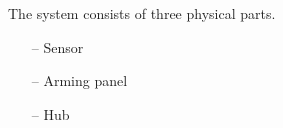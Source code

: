 The system consists of three physical parts.
\begin{itemize}
	\item[--]Sensor
	\item[--]Arming panel
	\item[--]Hub
\end{itemize} 




